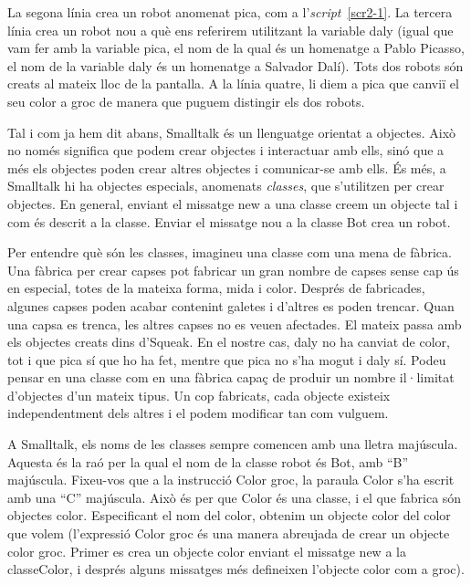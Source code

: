 La segona línia crea un robot anomenat \textsf{pica}, com a l'\emph{script}~\ref{scr2-1}. La tercera línia crea un robot nou a què ens referirem utilitzant la variable \textsf{daly} (igual que vam fer amb la variable \textsf{pica}, el nom de la qual és un homenatge a Pablo Picasso, el nom de la variable \textsf{daly} és un homenatge a Salvador Dalí). Tots dos robots són creats al mateix lloc de la pantalla. A la línia quatre, li diem a \textsf{pica} que canviï el seu color a groc de manera que puguem distingir els dos robots.

Tal i com ja hem dit abans, Smalltalk és un llenguatge orientat a objectes. Això no només significa que podem crear objectes i interactuar amb ells, sinó que a més els objectes poden crear altres objectes i comunicar-se amb ells. És més, a Smalltalk hi ha objectes especials, anomenats \emph{classes}, que s'utilitzen per crear objectes. En general, enviant el missatge \textsf{new} a una classe creem un objecte tal i com és descrit a la classe. Enviar el missatge \textsf{nou} a la classe \textsf{Bot} crea un robot.

Per entendre què són les classes, imagineu una classe com una mena de fàbrica. Una fàbrica per crear capses pot fabricar un gran nombre de capses sense cap ús en especial, totes de la mateixa forma, mida i color. Després de fabricades, algunes capses poden acabar contenint galetes i d'altres es poden trencar. Quan una capsa es trenca, les altres capses no es veuen afectades. El mateix passa amb els objectes creats dins d'Squeak. En el nostre cas, \textsf{daly} no ha canviat de color, tot i que \textsf{pica} sí que ho ha fet, mentre que \textsf{pica} no s'ha mogut i \textsf{daly} sí. Podeu pensar en una classe com en una fàbrica capaç de produir un nombre il·limitat d'objectes d'un mateix tipus. Un cop fabricats, cada objecte existeix independentment dels altres i el podem modificar tan com vulguem.

A Smalltalk, els noms de les classes sempre comencen amb una lletra majúscula. Aquesta és la raó per la qual el nom de la classe robot és \textsf{Bot}, amb ``B'' majúscula. Fixeu-vos que a la instrucció \textsf{Color groc}, la paraula \textsf{Color} s'ha escrit amb una ``C'' majúscula. Això és per que \textsf{Color} és una classe, i el que fabrica són objectes color. Especificant el nom del color, obtenim un objecte color del color que volem (l'expressió \textsf{Color groc} és una manera abreujada de crear un objecte color groc. Primer es crea un objecte color enviant el missatge \textsf{new} a la classe\textsf{Color}, i després alguns missatges més defineixen l'objecte color com a groc). 

